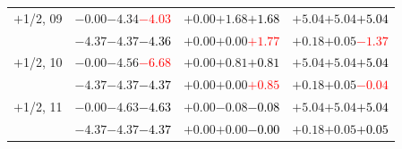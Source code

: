 \documentclass[compress]{beamer}
\begin{document}
\begin{frame}
\begin{tabular}{r | c | c | c}
$+$1/2, 09 & $-0.00$\hspace{0.1 cm}$-4.34$\hspace{0.1 cm}\textcolor{red}{$-4.03$} & $+0.00$\hspace{0.1 cm}$+1.68$\hspace{0.1 cm}\textcolor{black}{$+1.68$} & $+5.04$\hspace{0.1 cm}$+5.04$\hspace{0.1 cm}\textcolor{black}{$+5.04$} \\
           & $-4.37$\hspace{0.1 cm}$-4.37$\hspace{0.1 cm}\textcolor{black}{$-4.36$} & $+0.00$\hspace{0.1 cm}$+0.00$\hspace{0.1 cm}\textcolor{red}{$+1.77$} & $+0.18$\hspace{0.1 cm}$+0.05$\hspace{0.1 cm}\textcolor{red}{$-1.37$} \\
$+$1/2, 10 & $-0.00$\hspace{0.1 cm}$-4.56$\hspace{0.1 cm}\textcolor{red}{$-6.68$} & $+0.00$\hspace{0.1 cm}$+0.81$\hspace{0.1 cm}\textcolor{black}{$+0.81$} & $+5.04$\hspace{0.1 cm}$+5.04$\hspace{0.1 cm}\textcolor{black}{$+5.04$} \\
           & $-4.37$\hspace{0.1 cm}$-4.37$\hspace{0.1 cm}\textcolor{black}{$-4.37$} & $+0.00$\hspace{0.1 cm}$+0.00$\hspace{0.1 cm}\textcolor{red}{$+0.85$} & $+0.18$\hspace{0.1 cm}$+0.05$\hspace{0.1 cm}\textcolor{red}{$-0.04$} \\
$+$1/2, 11 & $-0.00$\hspace{0.1 cm}$-4.63$\hspace{0.1 cm}\textcolor{black}{$-4.63$} & $+0.00$\hspace{0.1 cm}$-0.08$\hspace{0.1 cm}\textcolor{black}{$-0.08$} & $+5.04$\hspace{0.1 cm}$+5.04$\hspace{0.1 cm}\textcolor{black}{$+5.04$} \\
           & $-4.37$\hspace{0.1 cm}$-4.37$\hspace{0.1 cm}\textcolor{black}{$-4.37$} & $+0.00$\hspace{0.1 cm}$+0.00$\hspace{0.1 cm}\textcolor{black}{$-0.00$} & $+0.18$\hspace{0.1 cm}$+0.05$\hspace{0.1 cm}\textcolor{black}{$+0.05$} \\

\end{tabular}
\end{frame}
\end{document}
